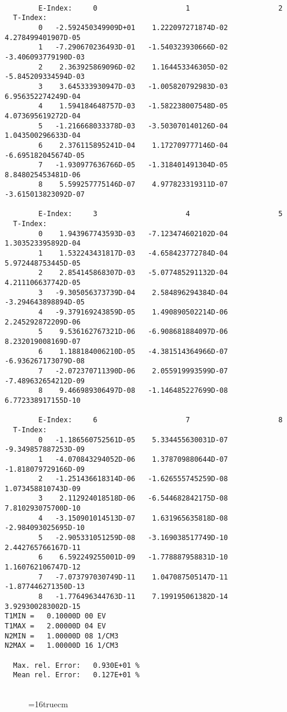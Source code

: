 \documentclass[12pt,dvipdfmx]{article}
\begin{document}
\begin{small}\begin{verbatim}

        E-Index:     0                     1                     2
  T-Index:
        0   -2.592450349909D+01    1.222097271874D-02    4.278499401907D-05
        1   -7.290670236493D-01   -1.540323930666D-02   -3.406093779190D-03
        2    2.363925869096D-02    1.164453346305D-02   -5.845209334594D-03
        3    3.645333930947D-03   -1.005820792983D-03    6.956352274249D-04
        4    1.594184648757D-03   -1.582238007548D-05    4.073695619272D-04
        5   -1.216668033378D-03   -3.503070140126D-04    1.043500296633D-04
        6    2.376115895241D-04    1.172709777146D-04   -6.695182045674D-05
        7   -1.930977636766D-05   -1.318401491304D-05    8.848025453481D-06
        8    5.599257775146D-07    4.977823319311D-07   -3.615013823092D-07

        E-Index:     3                     4                     5
  T-Index:
        0    1.943967743593D-03   -7.123474602102D-04    1.303523395892D-04
        1    1.532243431817D-03   -4.658423772784D-04    5.972448753445D-05
        2    2.854145868307D-03   -5.077485291132D-04    4.211106637742D-05
        3   -9.305056373739D-04    2.584896294384D-04   -3.294643898894D-05
        4   -9.379169243859D-05    1.490890502214D-06    2.245292872209D-06
        5    9.536162767321D-06   -6.908681884097D-06    8.232019008169D-07
        6    1.188184006210D-05   -4.381514364966D-07   -6.936267173079D-08
        7   -2.072370711390D-06    2.055919993599D-07   -7.489632654212D-09
        8    9.466989306497D-08   -1.146485227699D-08    6.772338917155D-10

        E-Index:     6                     7                     8
  T-Index:
        0   -1.186560752561D-05    5.334455630031D-07   -9.349857887253D-09
        1   -4.070843294052D-06    1.378709880644D-07   -1.818079729166D-09
        2   -1.251436618314D-06   -1.626555745259D-08    1.073458810743D-09
        3    2.112924018518D-06   -6.544682842175D-08    7.810293075700D-10
        4   -3.150901014513D-07    1.631965635818D-08   -2.984093025695D-10
        5   -2.905331051259D-08   -3.169038517749D-10    2.442765766167D-11
        6    6.592249255001D-09   -1.778887958831D-10    1.160762106747D-12
        7   -7.073797030749D-11    1.047087505147D-11   -1.877446271350D-13
        8   -1.776496344763D-11    7.199195061382D-14    3.929300283002D-15
T1MIN =   0.10000D 00 EV
T1MAX =   2.00000D 04 EV
N2MIN =   1.00000D 08 1/CM3
N2MAX =   1.00000D 16 1/CM3

  Max. rel. Error:   0.930E+01 %
  Mean rel. Error:   0.127E+01 %


\end{verbatim}\end{small}
\begin{figure} \label{2.1.8r}
\epsfxsize=16truecm
\end{figure}
\newpage
\end{document}
